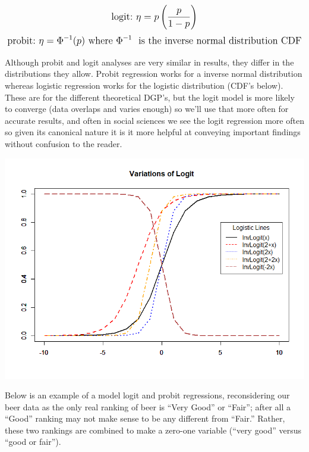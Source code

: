 \documentclass[12pt]{article}\usepackage[]{graphicx}\usepackage[]{color}
\begin{document}
\begin{flushleft}
\begin{equation}
\mathlarger{ \text{logit:}~ \eta =  p\left( \frac{p}{1-p}\right) }
\end{equation}
\begin{equation}
\mathlarger{ \text{probit:}~ \eta = \Phi^{-1}(p) ~ \text{where}~  \Phi^{-1} ~ \text{ is the inverse normal distribution CDF} }
\end{equation}

Although probit and logit analyses are very similar in results, they differ in the distributions they allow. Probit regression works for a inverse normal distribution whereas logistic regression works for the logistic distribution (CDF's below). These are for the different theoretical DGP's, but the logit model is more likely to converge (data overlaps and varies enough) so we'll use that more often for accurate results, and often in social sciences we see the logit regression more often so given its canonical nature it is it more helpful at conveying important findings without confusion to the reader.

\begin{center}
\includegraphics[scale=.5]{VarLogit}
\end{center}

\clearpage

Below is an example of a model logit and probit regressions, reconsidering our beer data as the only real ranking of beer is ``Very Good'' or ``Fair''; after all a ``Good'' ranking may not make sense to be any different from ``Fair.'' Rather, these two rankings are combined to make a zero-one variable (``very good'' versus ``good or fair'').


\end{flushleft}
\end{document}
